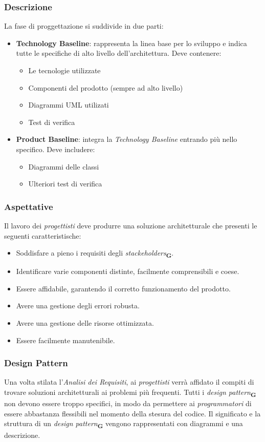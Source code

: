 \subsubsection{Descrizione}
La fase di proggettazione si suddivide in due parti:
\begin{itemize}
    \item\textbf{Technology Baseline}: rappresenta la linea base per lo sviluppo e indica tutte le specifiche di alto livello dell'architettura. Deve contenere:
          \begin{itemize}
              \item Le tecnologie utilizzate
              \item Componenti del prodotto (sempre ad alto livello)
              \item Diagrammi UML utilizati
              \item Test di verifica
          \end{itemize}
    \item\textbf{Product Baseline}: integra la \textit{Technology Baseline} entrando più nello specifico. Deve includere:
          \begin{itemize}
              \item Diagrammi delle classi
              \item Ulteriori test di verifica
          \end{itemize}
\end{itemize}
\subsubsection{Aspettative}
Il lavoro dei \textit{progettisti} deve produrre una soluzione architetturale che presenti le seguenti caratteristische:
\begin{itemize}
    \item Soddisfare a pieno i requisiti degli \textit{stackeholders}\textsubscript{\textbf{G}}.
    \item Identificare varie componenti distinte, facilmente comprensibili e coese.
    \item Essere affidabile, garantendo il corretto funzionamento del prodotto.
    \item Avere una gestione degli errori robusta.
    \item Avere una gestione delle risorse ottimizzata.
    \item Essere facilmente manutenibile.
\end{itemize}
\subsubsection{Design Pattern}
Una volta stilata l'\textit{Analisi dei Requisiti}, ai \textit{progettisti} verrà affidato il compiti di trovare soluzioni architetturali ai problemi più frequenti.
Tutti i \textit{design pattern}\textsubscript{\textbf{G}} non devono essere troppo specifici, in modo da permettere ai \textit{programmatori} di essere abbastanza flessibili nel momento della stesura del codice.
Il significato e la struttura di un \textit{design pattern}\textsubscript{\textbf{G}} vengono rappresentati con diagrammi e una descrizione.
